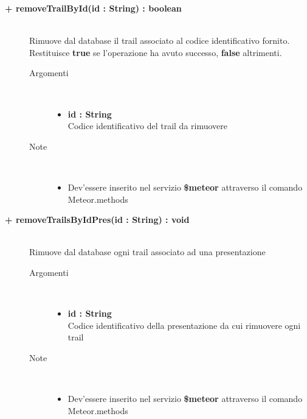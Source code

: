 \begin{description}
	\begin{description}
		\item[\textbf{\color{blue}+ removeTrailById(id : String) : boolean			}] \hfill \\
			Rimuove dal database il trail associato al codice identificativo fornito. Restituisce \textbf{true} se l'operazione ha avuto successo, \textbf{false} altrimenti.
			
		\begin{description}
			\item[Argomenti] \hfill \\
				\begin{itemize}
				
					\item \textbf{id : String		} \hfill \\
					Codice identificativo del trail da rimuovere
					
				\end{itemize}
			\item[Note] \hfill \\
			\begin{itemize}
					\item Dev'essere inserito nel servizio \textbf{\$meteor} attraverso il comando Meteor.methods
				\end{itemize}
		\end{description}
	\end{description}
	
	\begin{description}
		\item[\textbf{\color{blue}+ removeTrailsByIdPres(id : String) : void			}] \hfill \\
			Rimuove dal database ogni trail associato ad una presentazione
			
		\begin{description}
			\item[Argomenti] \hfill \\
				\begin{itemize}
				
					\item \textbf{id :  String		} \hfill \\
					Codice identificativo della presentazione da cui rimuovere ogni trail
					
				\end{itemize}
			\item[Note] \hfill \\
			\begin{itemize}
					\item Dev'essere inserito nel servizio \textbf{\$meteor} attraverso il comando Meteor.methods
				\end{itemize}
		\end{description}
	\end{description}
	

\end{description}
